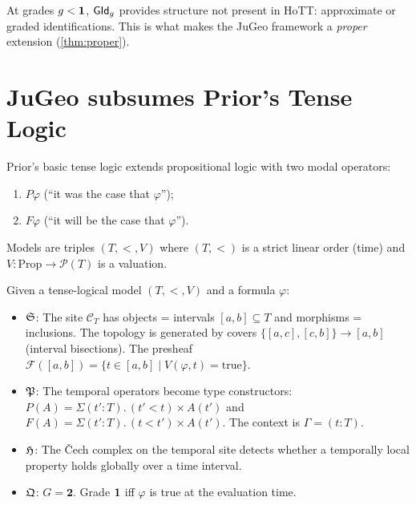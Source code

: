 \begin{remark}
At grades $g < \mathbf{1}$, $\mathsf{GId}_g$ provides structure not present in
HoTT: approximate or graded identifications.  This is what makes
the JuGeo framework a \emph{proper} extension (\cref{thm:proper}).
\end{remark}

\section{JuGeo subsumes Prior's Tense Logic}
\label{sec:sub-prior}

\begin{definition}
\label{def:prior}
Prior's basic tense logic extends propositional logic with two
modal operators:
\begin{enumerate}[label=(\roman*),nosep]
\item $P\varphi$ (``it was the case that $\varphi$'');
\item $F\varphi$ (``it will be the case that $\varphi$'').
\end{enumerate}
Models are triples $(T, <, V)$ where $(T, <)$ is a strict linear
order (time) and $V : \mathrm{Prop} \to \mathcal{P}(T)$ is a
valuation.
\end{definition}

\begin{construction}
\label{con:prior-embed}
Given a tense-logical model $(T, <, V)$ and a formula $\varphi$:
\begin{itemize}[nosep]
\item $\mathfrak{S}$: The site $\mathcal{C}_T$ has objects = intervals
  $[a,b] \subseteq T$ and morphisms = inclusions.  The topology is
  generated by covers $\{[a,c], [c,b]\} \to [a,b]$ (interval
  bisections).  The presheaf $\mathcal{F}([a,b]) = \{t \in [a,b]
  \mid V(\varphi, t) = \mathrm{true}\}$.

\item $\mathfrak{P}$: The temporal operators become type constructors:
  $P(A) = \Sigma(t' : T).\, (t' < t) \times A(t')$ and
  $F(A) = \Sigma(t' : T).\, (t < t') \times A(t')$.  The
  context is $\Gamma = (t : T)$.

\item $\mathfrak{H}$: The \v{C}ech complex on the temporal site detects
  whether a temporally local property holds globally over a time
  interval.

\item $\mathfrak{Q}$: $G = \mathbf{2}$.  Grade $\mathbf{1}$ iff $\varphi$ is
  true at the evaluation time.
\end{itemize}
\end{construction}

